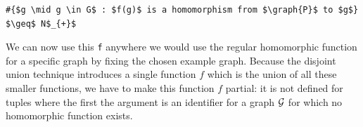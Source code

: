 \begin{center}
\begin{minipage}{0.62\linewidth}
\begin{lstlisting}[mathescape, caption=Globalized existential functions, label=lst:GlobalizeExistentialQuantifications]
#{$g \mid g \in G$ : $f(g)$ is a homomorphism from $\graph{P}$ to $g$} $\geq$ N$_{+}$
\end{lstlisting}
\end{minipage}
\end{center}

We can now use this \verb|f| anywhere we would use the regular homomorphic function for a specific graph by fixing the chosen example graph.
Because the disjoint union technique introduces a single function $f$ which is the union of all these smaller functions, we have to make this function $f$ partial: it is not defined for tuples where the first the argument is an identifier for a graph $\mathcal{G}$ for which no homomorphic function exists.




